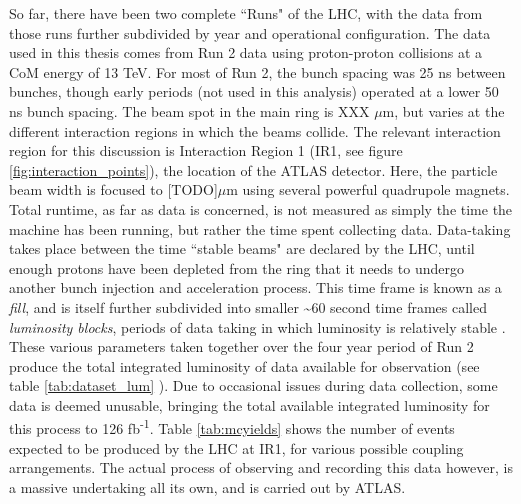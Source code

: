     So far, there have been two complete ``Runs" of the LHC, with the data from those runs further subdivided by year and operational configuration.
    The data used in this thesis comes from Run 2 data using proton-proton collisions at a CoM energy of 13 TeV.
    For most of Run 2, the bunch spacing was 25 ns between bunches, though early periods (not used in this analysis) operated at a lower 50 ns bunch spacing.
    The beam spot in the main ring is XXX $\mu$m, but varies at the different interaction regions in which the beams collide.
    The relevant interaction region for this discussion is Interaction Region 1 (IR1, see figure \ref{fig:interaction_points}), the location of the ATLAS detector.
    Here, the particle beam width is focused to [TODO]$\mu$m using several powerful quadrupole magnets.
    Total runtime, as far as data is concerned, is not measured as simply the time the machine has been running, but rather the time spent collecting data.
    Data-taking takes place between the time ``stable beams" are declared by the LHC, until enough protons have been depleted from the ring that it needs to undergo another bunch injection and acceleration process.
    This time frame is known as a \textit{fill},
        and is itself further subdivided into smaller \textasciitilde 60 second time frames called \textit{luminosity blocks},
        periods of data taking in which luminosity is relatively stable \cite{data_quality}.
    These various parameters taken together over the four year period of Run 2 produce the total integrated luminosity of data available for observation (see table \ref{tab:dataset_lum} ).
    Due to occasional issues during data collection, some data is deemed unusable,
        bringing the total available integrated luminosity for this process to 126 fb\textsuperscript{-1}.
    Table \ref{tab:mcyields} shows the number of \vbfhhproc events expected to be produced by the LHC at IR1,
        for various possible coupling arrangements.
    The actual process of observing and recording this data however, is a massive undertaking all its own, and is carried out by ATLAS.
